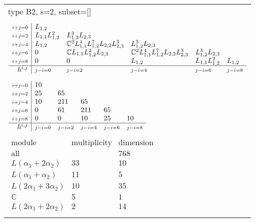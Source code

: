 \documentclass[crop,border=2mm]{standalone}
\begin{document}
\begin{tabular}{l}
{\huge type B2, s=2, subset=[]}\\ \\


$\displaystyle
\begin{array}{r|l l l l l}
	{\scriptstyle i+j=0}&L_{1,2}&&&&\\
	{\scriptstyle i+j=2}&L_{1,1}L_{1,2}^{2}&L_{1,2}^{3}L_{2,3}&&&\\
	{\scriptstyle i+j=4}&L_{1,2}&\mathbb{C}^{2}L_{1,1}^{4}L_{1,2}^{7}L_{2,2}L_{2,3}^{3}&L_{1,2}^{3}L_{2,3}&&\\
	{\scriptstyle i+j=6}&0&\mathbb{C}L_{1,1}L_{1,2}^{2}L_{2,3}&\mathbb{C}^{2}L_{1,1}^{4}L_{1,2}^{7}L_{2,2}L_{2,3}^{3}&L_{1,2}^{3}L_{2,3}&\\
	{\scriptstyle i+j=8}&0&0&L_{1,2}&L_{1,1}L_{1,2}^{2}&L_{1,2}\\
	\hline h^{i,j}&{\scriptstyle j-i=0}&{\scriptstyle j-i=2}&{\scriptstyle j-i=4}&{\scriptstyle j-i=6}&{\scriptstyle j-i=8}
\end{array}
$ \\ \\


$\displaystyle
\begin{array}{r|l l l l l}
	{\scriptstyle i+j=0}&10&&&&\\
	{\scriptstyle i+j=2}&25&65&&&\\
	{\scriptstyle i+j=4}&10&211&65&&\\
	{\scriptstyle i+j=6}&0&61&211&65&\\
	{\scriptstyle i+j=8}&0&0&10&25&10\\
	\hline h^{i,j}&{\scriptstyle j-i=0}&{\scriptstyle j-i=2}&{\scriptstyle j-i=4}&{\scriptstyle j-i=6}&{\scriptstyle j-i=8}
\end{array}
$ \\ \\


$\displaystyle
\begin{array}{rll}
	\text{module}&\text{multiplicity}&\text{dimension} \\ \hline \text{all}&&768 \\
	L\left(\alpha_{1}+ 2\alpha_{2}\right)&33&10\\
	L\left(\alpha_{1}+\alpha_{2}\right)&11&5\\
	L\left( 2\alpha_{1}+ 3\alpha_{2}\right)&10&35\\
	\mathbb{C}&5&1\\
	L\left( 2\alpha_{1}+ 2\alpha_{2}\right)&2&14
\end{array}
$ \\ \\

\end{tabular}
\end{document}
